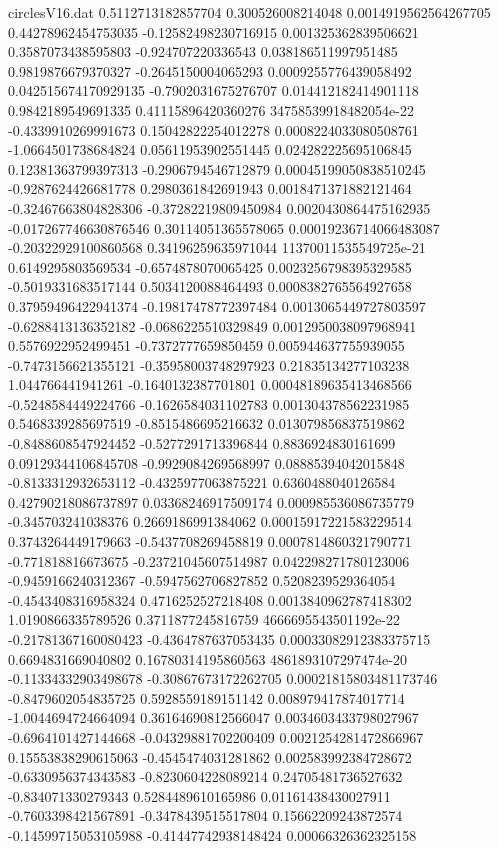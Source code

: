 \begin{filecontents}{circlesV16.dat}
0.5112713182857704	0.300526008214048	0.0014919562564267705
0.44278962454753035	-0.12582498230716915	0.001325362839506621
0.3587073438595803	-0.924707220336543	0.038186511997951485
0.9819876679370327	-0.2645150004065293	0.0009255776439058492
0.042515674170929135	-0.7902031675276707	0.014412182414901118
0.9842189549691335	0.41115896420360276	34758539918482054e-22
-0.4339910269991673	0.15042822254012278	0.0008224033080508761
-1.0664501738684824	0.05611953902551445	0.024282225695106845
0.12381363799397313	-0.2906794546712879	0.00045199050838510245
-0.9287624426681778	0.2980361842691943	0.0018471371882121464
-0.32467663804828306	-0.37282219809450984	0.0020430864475162935
-0.017267746630876546	0.30114051365578065	0.00019236714066483087
-0.20322929100860568	0.34196259635971044	11370011535549725e-21
0.6149295803569534	-0.6574878070065425	0.0023256798395329585
-0.5019331683517144	0.5034120088464493	0.0008382765564927658
0.37959496422941374	-0.19817478772397484	0.0013065449727803597
-0.6288413136352182	-0.0686225510329849	0.0012950038097968941
0.5576922952499451	-0.7372777659850459	0.005944637755939055
-0.7473156621355121	-0.35958003748297923	0.21835134277103238
1.044766441941261	-0.1640132387701801	0.00048189635413468566
-0.5248584449224766	-0.1626584031102783	0.001304378562231985
0.5468339285697519	-0.8515486695216632	0.013079856837519862
-0.8488608547924452	-0.5277291713396844	0.8836924830161699
0.09129344106845708	-0.9929084269568997	0.08885394042015848
-0.8133312932653112	-0.4325977063875221	0.6360488040126584
0.42790218086737897	0.03368246917509174	0.000985536086735779
-0.345703241038376	0.2669186991384062	0.00015917221583229514
0.3743264449179663	-0.5437708269458819	0.0007814860321790771
-0.771818816673675	-0.23721045607514987	0.042298271780123006
-0.9459166240312367	-0.5947562706827852	0.5208239529364054
-0.4543408316958324	0.4716252527218408	0.0013840962787418302
1.0190866335789526	0.3711877245816759	4666695543501192e-22
-0.21781367160080423	-0.4364787637053435	0.00033082912383375715
0.6694831669040802	0.16780314195860563	4861893107297474e-20
-0.11334332903498678	-0.30867673172262705	0.00021815803481173746
-0.8479602054835725	0.5928559189151142	0.008979417874017714
-1.0044694724664094	0.36164690812566047	0.0034603433798027967
-0.6964101427144668	-0.04329881702200409	0.0021254281472866967
0.15553838290615063	-0.4545474031281862	0.002583992384728672
-0.6330956374343583	-0.8230604228089214	0.24705481736527632
-0.834071330279343	0.5284489610165986	0.01161438430027911
-0.7603398421567891	-0.3478439515517804	0.15662209243872574
-0.14599715053105988	-0.41447742938148424	0.00066326362325158

\end{filecontents}
